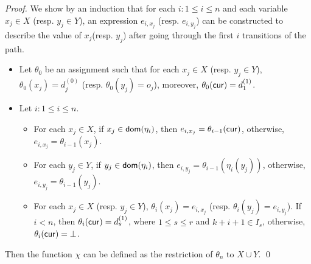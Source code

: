 \begin{appendix}
\begin{proof}
We show by an induction that for each $i: 1 \le i \le n$ and each variable $x_j \in X$ (resp. $y_j \in Y$), an expression $e_{i,x_j}$ (resp. $e_{i,y_j}$) can be constructed to describe the value of $x_j$(resp. $y_j$) after going through the first $i$ transitions of the path. 
%
\begin{itemize}
\item Let $\theta_0$ be an assignment such that for each $x_j \in X$ (resp. $y_j \in Y$), $\theta_0(x_j)=d^{(0)}_j$ (resp. $\theta_0(y_j)=o_j$), moreover, $\theta_0(\mathsf{cur})=d^{(1)}_1$.
%
%
\item Let $i: 1 \le i \le n$. 
\begin{itemize}
\item For each $x_j \in X$, if $x_j \in \mathsf{dom}(\eta_i)$, then $e_{i,x_j}=\theta_{i-1}(\mathsf{cur})$, otherwise, $e_{i,x_j}=\theta_{i-1}(x_j)$.
%
\item For each $y_j \in Y$, if $y_j \in \mathsf{dom}(\eta_i)$, then $e_{i,y_j} = \theta_{i-1}(\eta_i(y_j))$, otherwise, $e_{i,y_j}=\theta_{i-1}(y_j)$.
%
\item For each $x_{j} \in X$ (resp. $y_j \in Y$), $\theta_i(x_{j})=e_{i,x_{j}}$ (resp. $\theta_i(y_{j})=e_{i, y_{j}}$). If $i < n$, then $\theta_i(\mathsf{cur})=d^{(1)}_{s}$, where $1\le s \le r$ and $k+i + 1 \in I_s$, otherwise, $\theta_i(\mathsf{cur})=\bot$.
\end{itemize}
\end{itemize}
Then the function $\chi$ can be defined as the restriction of $\theta_n$ to $X \cup Y$.
\qed
\end{proof}



\end{appendix}
